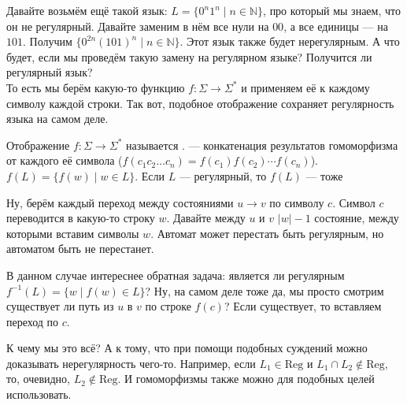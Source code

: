 \documentclass{article}
\begin{document}
\begin{itemize}
\begin{Comment}
        \end{Comment}
        \begin{Comment}
            Давайте возьмём ещё такой язык: $L=\{0^n1^n\mid n\in\mathbb N\}$, про который мы знаем, что он не регулярный. Давайте заменим в нём все нули на $00$, а все единицы --- на $101$. Получим $\{0^{2n}(101)^n\mid n\in\mathbb N\}$. Этот язык также будет нерегулярным. А что будет, если мы проведём такую замену на регулярном языке? Получится ли регулярный язык?\\
            То есть мы берём какую-то функцию $f\colon\Sigma\to\Sigma^*$ и применяем её к каждому символу каждой строки. Так вот, подобное отображение сохраняет регулярность языка на самом деле.
        \end{Comment}
        \dfn Отображение $f\colon\Sigma\to\Sigma^*$ называется .
        \dfn {} --- конкатенация результатов гомоморфизма от каждого её символа ($f(c_1c_2\ldots c_n)=f(c_1)f(c_2)\cdots f(c_n)$).
        \dfn $f(L)=\{f(w)\mid w\in L\}$.
        \thm Если $L$ --- регулярный, то $f(L)$ --- тоже
        \begin{Proof}
            Ну, берём каждый переход между состояниями $u\to v$ по символу $c$. Символ $c$ переводится в какую-то строку $w$. Давайте между $u$ и $v$ $|w|-1$ состояние, между которыми вставим символы $w$. Автомат может перестать быть регулярным, но автоматом быть не перестанет.
        \end{Proof}
        \begin{Comment}
            В данном случае интереснее обратная задача: является ли регулярным $f^{-1}(L)=\{w\mid f(w)\in L\}$? Ну, на самом деле тоже да, мы просто смотрим существует ли путь из $u$ в $v$ по строке $f(c)$? Если существует, то вставляем переход по $c$.
        \end{Comment}
        \begin{Comment}
            К чему мы это всё? А к тому, что при помощи подобных суждений можно доказывать нерегулярность чего-то. Например, если $L_1\in\mathrm{Reg}$ и $L_1\cap L_2\notin\mathrm{Reg}$, то, очевидно, $L_2\notin\mathrm{Reg}$. И гомоморфизмы также можно для подобных целей использовать.
        \end{Comment}
    \end{itemize}
\end{document}
